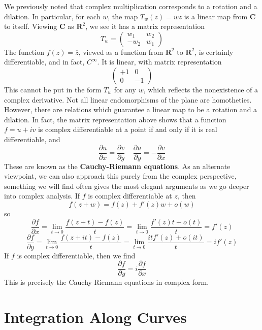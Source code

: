 We previously noted that complex multiplication corresponds to a rotation and a dilation. In particular, for each $w$, the map $T_w(z) = wz$ is a linear map from $\mathbf{C}$ to itself. Viewing $\mathbf{C}$ as $\mathbf{R}^2$, we see it has a matrix representation
%
\[ T_w = \begin{pmatrix} w_1 & w_2 \\ -w_2 & w_1 \end{pmatrix} \]
%
The function $f(z) = \overline{z}$, viewed as a function from $\mathbf{R}^2$ to $\mathbf{R}^2$, is certainly differentiable, and in fact, $C^\infty$. It is linear, with matrix representation
%
\[ \begin{pmatrix} +1 & 0 \\ 0 & -1 \end{pmatrix} \]
%
This cannot be put in the form $T_w$ for any $w$, which reflects the nonexistence of a complex derivative. Not all linear endomorphisms of the plane are homotheties. However, there are relations which guarantee a linear map to be a rotation and a dilation. In fact, the matrix representation above shows that a function $f = u + iv$ is complex differentiable at a point if and only if it is real differentiable, and
%
\[ \frac{\partial u}{\partial x} = \frac{\partial v}{\partial y}\ \ \ \ \ \frac{\partial u}{\partial y} = -\frac{\partial v}{\partial x} \]
%
These are known as the {\bf Cauchy-Riemann equations}. As an alternate viewpoint, we can also approach this purely from the complex perspective, something we will find often gives the most elegant arguments as we go deeper into complex analysis. If $f$ is complex differentiable at $z$, then
%
\[ f(z + w) = f(z) + f'(z)w + o(w) \]
%
so
%
\[ \frac{\partial f}{\partial x} = \lim_{t \to 0} \frac{f(z + t) - f(z)}{t} = \lim_{t \to 0} \frac{f'(z)t + o(t)}{t} = f'(z) \]
\[ \frac{\partial f}{\partial y} = \lim_{t \to 0} \frac{f(z + it) - f(z)}{t} = \lim_{t \to 0} \frac{itf'(z) + o(it)}{t} = if'(z) \]
%
If $f$ is complex differentiable, then we find
%
\[ \frac{\partial f}{\partial y} = i\frac{\partial f}{\partial x} \]
%
This is precisely the Cauchy Riemann equations in complex form.

\section{Integration Along Curves}

